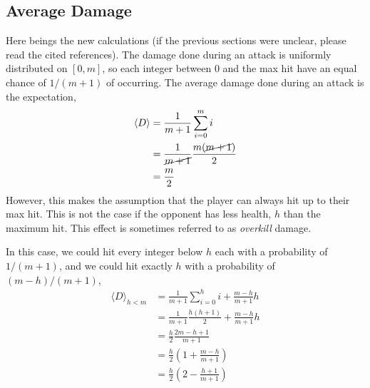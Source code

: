 \documentclass[../../main.tex]{subfiles}
\begin{document}
		\subsection{Average Damage}
			Here beings the new calculations (if the previous sections were unclear, please read the cited references). The damage done during an attack is uniformly distributed on $[0, m]$, so each integer between 0 and the max hit have an equal chance of $1/(m + 1)$ of occurring. The average damage done during an attack is the expectation,
			\begin{align}
				\langle D \rangle &= \frac{1}{m+1}\sum_{i=0}^{m} i\\
				&= \frac{1}{\cancel{m+1}}\frac{m(\cancel{m+1})}{2}\\
				&= \frac{m}{2}
			\end{align}
			However, this makes the assumption that the player can always hit up to their max hit. This is not the case if the opponent has less health, $h$ than the maximum hit. This effect is sometimes referred to as \textit{overkill} damage.
			\begin{center}
			\end{center}
			In this case, we could hit every integer below $h$ each with a probability of $1/(m+1)$, and we could hit exactly $h$ with a probability of $(m-h)/(m+1)$,
			\begin{align}
				\langle D \rangle_{h < m} &= \frac{1}{m+1}\sum_{i=0}^{h} i + \frac{m-h}{m+1}h \\
				&= \frac{1}{m+1}\frac{h(h+1)}{2} + \frac{m-h}{m+1}h \\
				&= \frac{h}{2}\frac{2m-h+1}{m+1}\\
				&= \frac{h}{2}\left(1 + \frac{m - h}{m+1}\right)\\
				&= \frac{h}{2}\left(2 - \frac{h + 1}{m+1}\right)
			\end{align}
\end{document}
